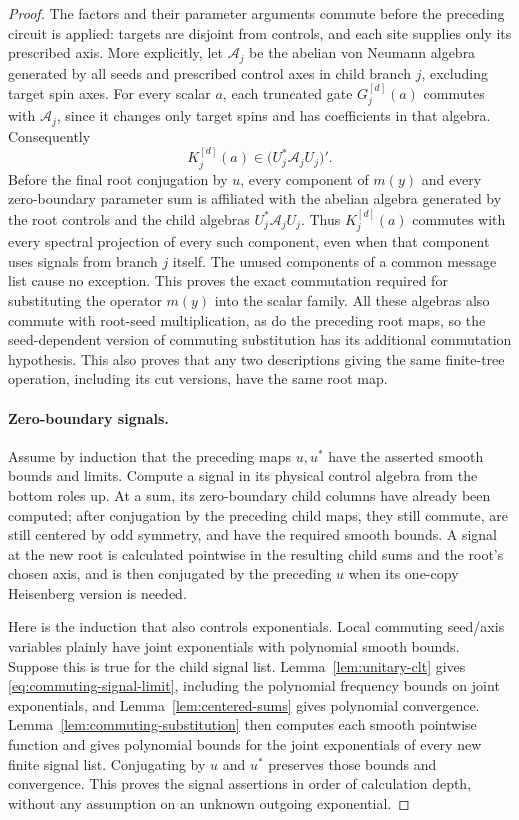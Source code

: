 \begin{proof}
The factors and their parameter arguments commute before
the preceding circuit is applied: targets are disjoint from
controls, and each site supplies only its prescribed axis.
More explicitly, let $\mathcal A_j$ be the abelian von
Neumann algebra generated by all seeds and prescribed
control axes in child branch $j$, excluding target spin
axes.  For every scalar $a$, each truncated gate
$G_j^{[d]}(a)$ commutes with $\mathcal A_j$, since it
changes only target spins and has coefficients in that
algebra.  Consequently
\[
 K_j^{[d]}(a)\in\bigl(U_j^*\mathcal A_jU_j\bigr)'.
\]
Before the final root conjugation by $u$, every component
of $m(y)$ and every zero-boundary parameter sum is
affiliated with the abelian algebra generated by the
root controls and the child algebras
$U_j^*\mathcal A_jU_j$.  Thus $K_j^{[d]}(a)$ commutes
with every spectral projection of every such component,
even when that component uses signals from branch $j$
itself.  The unused components of a common message list
cause no exception.  This proves the exact commutation
required for substituting the operator $m(y)$ into the
scalar family.  All these algebras also commute with
root-seed multiplication, as do the preceding root
maps, so the seed-dependent version of commuting
substitution has its additional commutation hypothesis.
This also proves
that any two descriptions giving the same finite-tree
operation, including its cut versions, have the same root
map.

\paragraph{Zero-boundary signals.}
Assume by induction that the preceding maps $u,u^*$ have
the asserted smooth bounds and limits.  Compute a signal
in its physical control algebra from the bottom roles up.
At a sum, its zero-boundary child columns have already been
computed; after conjugation by the preceding child maps,
they still commute, are still centered by odd symmetry,
and have the required smooth bounds.  A signal at the new
root is calculated pointwise in the resulting child sums
and the root's chosen axis, and is then conjugated by the
preceding $u$ when its one-copy Heisenberg version is needed.

Here is the induction that also controls exponentials.
Local commuting seed/axis variables plainly have joint
exponentials with polynomial smooth bounds.  Suppose this
is true for the child signal list.  Lemma~\ref{lem:unitary-clt}
gives \eqref{eq:commuting-signal-limit}, including the
polynomial frequency bounds on joint exponentials, and
Lemma~\ref{lem:centered-sums} gives polynomial convergence.
Lemma~\ref{lem:commuting-substitution} then computes each
smooth pointwise function and gives polynomial bounds for
the joint exponentials of every new finite signal list.
Conjugating by $u$ and $u^*$ preserves those bounds and
convergence.  This proves the signal assertions in order
of calculation depth, without any assumption on an unknown
outgoing exponential.


\end{proof}
